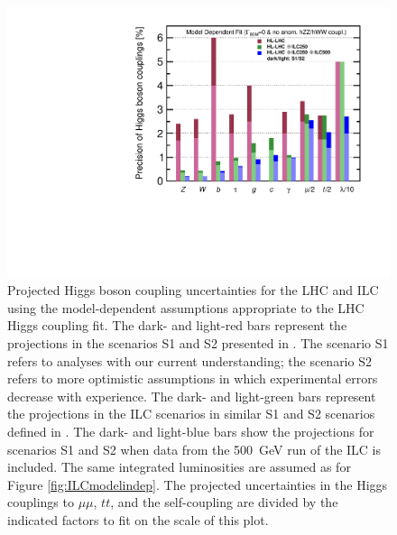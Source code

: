 \documentclass[%
 reprint,
 floatfix,
 amsmath,amssymb,
 aps,
]{revtex4-1}
\begin{document}
\begin{figure}
\begin{center}
\includegraphics[width=0.99\hsize]{figures/ModeldepSummary.pdf}
\caption{Projected Higgs boson coupling uncertainties for the LHC and
  ILC
using the model-dependent assumptions appropriate to the LHC Higgs
coupling fit.   The
dark- and light-red bars represent the projections in the scenarios S1
and S2 presented in \cite{Yellow,CMSYellow}.  The scenario S1 refers to
analyses with our current understanding; the scenario S2 refers to
more optimistic assumptions in which experimental errors decrease with
experience.  The dark- and light-green bars represent the
projections in the ILC scenarios in similar S1 and S2 scenarios defined in \cite{ILCforESS}. 
 The dark- and light-blue bars show the projections for scenarios S1 and S2
when
data from the 500~GeV run of the ILC is included. The same integrated luminosities are assumed as for Figure \ref{fig:ILCmodelindep}. The projected uncertainties in the Higgs couplings to $\mu\mu$, $tt$, and the self-coupling are divided by the indicated factors to fit on the scale of this plot.}
 \label{fig:ILCLHC}
\end{center}
\vspace{-0.7cm}
\end{figure}
\end{document}

